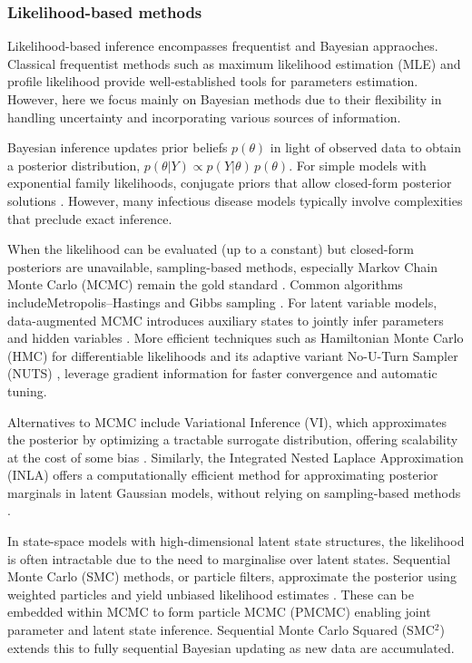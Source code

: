 \documentclass{article}
\begin{document}
\subsubsection{Likelihood-based methods}
Likelihood-based inference encompasses frequentist and Bayesian appraoches. Classical frequentist methods such as maximum likelihood estimation (MLE)\citep{myung2003tutorial, baltazar2024maximum} and profile likelihood \citep{tonsing2018profile, plank2024structured} provide well-established tools for parameters estimation. However, here we focus mainly on Bayesian methods due to their flexibility in handling uncertainty and incorporating various sources of information.

Bayesian inference updates prior beliefs $ p(\theta)$ in light of observed data to obtain a posterior distribution, $p(\theta | Y) \propto p(Y|\theta) \,p(\theta)$. For simple models with exponential family likelihoods, conjugate priors that allow closed-form posterior solutions \citep{gelman1995bayesian,  cori2013new}. However, many infectious disease models typically involve complexities that preclude exact inference.

When the likelihood can be evaluated (up to a constant) but closed-form posteriors are unavailable, sampling-based methods, especially Markov Chain Monte Carlo (MCMC) remain the gold standard \citep{gilks1995markov, lekone2006statistical}. Common algorithms includeMetropolis–Hastings \citep{hastings1970monte} and Gibbs sampling \citep{geman1984stochastic}. For latent variable models, data-augmented MCMC introduces auxiliary states to jointly infer parameters and hidden variables \citep{o1999bayesian}. More efficient techniques such as Hamiltonian Monte Carlo (HMC) for differentiable likelihoods \citep{duane1987hybrid} and its adaptive variant No-U-Turn Sampler (NUTS) \citep{hoffman2014no, andrade2020evaluation}, leverage gradient information for faster convergence and automatic tuning. 

Alternatives to MCMC include Variational Inference (VI), which approximates the posterior by optimizing a tractable surrogate distribution, offering scalability at the cost of some bias \citep{blei2017variational, chatzilena2019contemporary}. Similarly, the Integrated Nested Laplace Approximation (INLA) 
offers a computationally efficient method for approximating posterior marginals in latent Gaussian models, without relying on sampling-based methods \citep{rue2017bayesian}.

In state-space models with high-dimensional latent state structures, the likelihood is often intractable due to the need to marginalise over latent states. Sequential Monte Carlo (SMC) methods, or particle filters, approximate the posterior using weighted particles and yield unbiased likelihood estimates \citep{doucet2001introduction}. These can be embedded within MCMC to form particle MCMC (PMCMC) \citep{andrieu2010particle, endo2019introduction} enabling joint parameter and latent state inference. Sequential Monte Carlo Squared (SMC$^2$) \citep{chopin2013smc2} extends this to fully sequential Bayesian updating as new data are accumulated.
\end{document}
